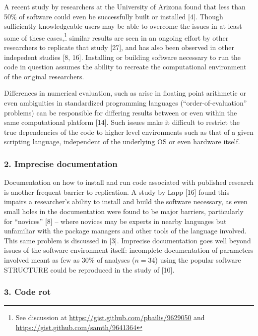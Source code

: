 \documentclass[9pt]{components/acm_proc_article-sp}
\begin{document}
A recent study by researchers at the University of Arizona found that
less than 50\% of software could even be successfully built or installed
{[}4{]}. Though sufficiently knowledgeable users may be able to overcome
the issues in at least some of these cases,\footnote{See discussion at
  \url{https://gist.github.com/pbailis/9629050} and
  \url{https://gist.github.com/samth/9641364}} similar results are seen
in an ongoing effort by other researchers to replicate that study
{[}27{]}, and has also been observed in other indepedent studies {[}8,
16{]}. Installing or building software necessary to run the code in
question assumes the ability to recreate the computational environment
of the original researchers.

Differences in numerical evaluation, such as arise in floating point
arithmetic or even ambiguities in standardized programming languages
(``order-of-evaluation'' problems) can be responsible for differing
results between or even within the same computational platform {[}14{]}.
Such issues make it difficult to restrict the true dependencies of the
code to higher level environments such as that of a given scripting
language, independent of the underlying OS or even hardware itself.

\subsubsection{2. \textbf{Imprecise
documentation}}\label{imprecise-documentation}

Documentation on how to install and run code associated with published
research is another frequent barrier to replication. A study by Lapp
{[}16{]} found this impairs a researcher's ability to install and build
the software necessary, as even small holes in the documentation were
found to be major barriers, particularly for ``novices'' {[}8{]} --
where novices may be experts in nearby languages but unfamiliar with the
package managers and other tools of the language involved. This same
problem is discussed in {[}3{]}. Imprecise documentation goes well
beyond issues of the software environment itself: incomplete
documentation of parameters involved meant as few as 30\% of analyses
(\(n=34\)) using the popular software STRUCTURE could be reproduced in
the study of {[}10{]}.

\subsubsection{3. \textbf{Code rot}}\label{code-rot}
\end{document}
